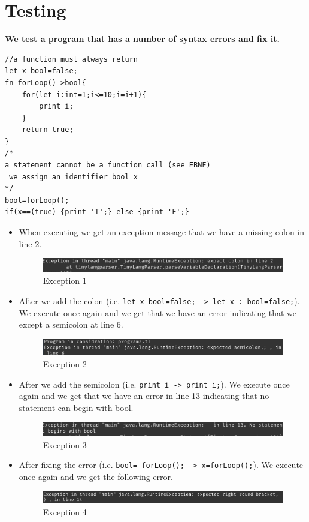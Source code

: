 \section{Testing}
\textbf{We test a program that has a number of  syntax errors and fix it.}
\begin{lstlisting}[basicstyle=\tiny,caption=Program 3]
//a function must always return
let x bool=false;
fn forLoop()->bool{
	for(let i:int=1;i<=10;i=i+1){
		print i;
	}
	return true;
}
/*
a statement cannot be a function call (see EBNF)
 we assign an identifier bool x
*/
bool=forLoop();
if(x==(true) {print 'T';} else {print 'F';}
\end{lstlisting}
\begin{itemize}
	\item When executing we get an exception message that we have a missing colon in line 2.
	      \begin{figure}[H]
	      	\centering
	      	\includegraphics[scale=0.6]{Task2/image/error1.png}
	      	\caption{Exception 1}
	      	\label{fig:Exception 1}
	      \end{figure}
	          
	\item After we add the colon (i.e.
	      \verb!let x bool=false; -> let x : bool=false;!). We execute once again and we get that we have an error indicating that we except a semicolon at line 6.
	      \begin{figure}[H]
	      	\centering
	      	\includegraphics[scale=0.6]{Task2/image/error2.png}
	      	\caption{Exception 2}
	      	\label{fig:Exception 2}
	      \end{figure}
	          
	\item After we add the semicolon (i.e.
	      \verb!print i -> print i;!). We execute once again and we get that we have an error in line 13 indicating that no statement can begin with bool.
	      \begin{figure}[H]
	      	\centering
	      	\includegraphics[scale=0.8]{Task2/image/error3.png}
	      	\caption{Exception 3}
	      	\label{fig:Exception 3}
	      \end{figure}
	\item After fixing the error (i.e.
	      \verb!bool=-forLoop(); -> x=forLoop();!). We execute once again and we get the following error.
	      \begin{figure}[H]
	      	\centering
	      	\includegraphics[scale=0.8]{Task2/image/error4.png}
	      	\caption{Exception 4}
	      	\label{fig:Exception 4}
	      \end{figure}
	          

\end{itemize}
